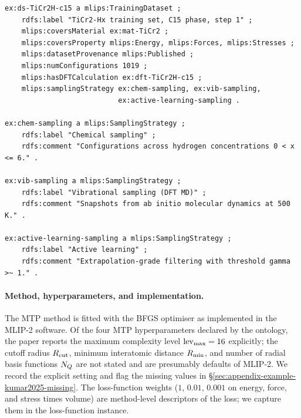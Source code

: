 \begin{lstlisting}[language=turtle,caption={Training dataset and sampling strategies.}]
ex:ds-TiCr2H-c15 a mlips:TrainingDataset ;
    rdfs:label "TiCr2-Hx training set, C15 phase, step 1" ;
    mlips:coversMaterial ex:mat-TiCr2 ;
    mlips:coversProperty mlips:Energy, mlips:Forces, mlips:Stresses ;
    mlips:datasetProvenance mlips:Published ;
    mlips:numConfigurations 1019 ;
    mlips:hasDFTCalculation ex:dft-TiCr2H-c15 ;
    mlips:samplingStrategy ex:chem-sampling, ex:vib-sampling,
                           ex:active-learning-sampling .

ex:chem-sampling a mlips:SamplingStrategy ;
    rdfs:label "Chemical sampling" ;
    rdfs:comment "Configurations across hydrogen concentrations 0 < x <= 6." .

ex:vib-sampling a mlips:SamplingStrategy ;
    rdfs:label "Vibrational sampling (DFT MD)" ;
    rdfs:comment "Snapshots from ab initio molecular dynamics at 500 K." .

ex:active-learning-sampling a mlips:SamplingStrategy ;
    rdfs:label "Active learning" ;
    rdfs:comment "Extrapolation-grade filtering with threshold gamma >~ 1." .
\end{lstlisting}

\paragraph{Method, hyperparameters, and implementation.}
The MTP method is fitted with the BFGS optimiser as implemented in the
MLIP-2 software. Of the four MTP hyperparameters declared by the
ontology, the paper reports the maximum complexity level $\operatorname{lev}_{\mathrm{max}} = 16$
explicitly; the cutoff radius $R_{\mathrm{cut}}$, minimum interatomic distance
$R_{\mathrm{min}}$, and number of radial basis functions $N_Q$ are not
stated and are presumably defaults of MLIP-2. We record the explicit
setting and flag the missing values in
\S\ref{sec:appendix-example-kumar2025-missing}. The loss-function
weights ($1$, $0.01$, $0.001$ on energy, force, and stress times
volume) are method-level descriptors of the loss; we capture them in
the loss-function instance.

